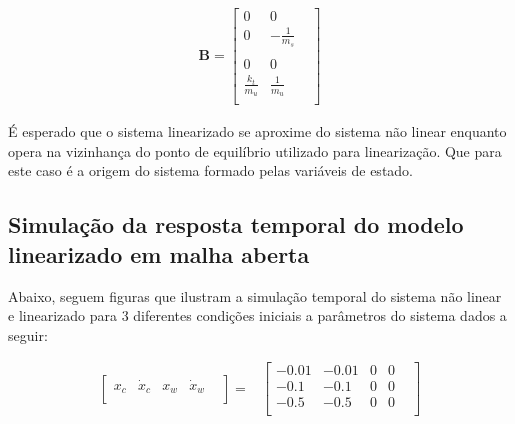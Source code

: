 \documentclass[a4paper]{ifacconf}
\begin{document}
    \begin{equation} 
    \begin{split}
        \mathbf{B} = 
        \begin{bmatrix}
            0 & 0 & \\
            0 & -\frac{1}{m_s}&\\ \\
            0 & 0 & \\
            \frac{k_t}{m_u}&\frac{1}{m_u} \\
        \end{bmatrix}
    \end{split}
    \end{equation}
    
    É esperado que o  sistema linearizado se aproxime do sistema não linear enquanto opera na vizinhança do ponto de equilíbrio utilizado para linearização. Que para este caso é a origem do sistema formado pelas variáveis de estado.
    
        \subsection{Simulação da resposta temporal do modelo linearizado em malha aberta}
    Abaixo, seguem figuras que ilustram a simulação temporal do sistema não linear e linearizado para 3 diferentes condições iniciais a parâmetros do sistema dados a seguir: 
    
    \begin{equation*} 
    \begin{split}
        \begin{bmatrix}
            x_c & \dot{x}_c & x_w & \dot{x}_w & \\
        \end{bmatrix}=
    \end{split}
    \begin{split}
        \begin{bmatrix}
            -0.01& -0.01& 0& 0& \\
             -0.1&  -0.1& 0& 0& \\
             -0.5&  -0.5& 0& 0&\\
        \end{bmatrix}
    \end{split}
    \end{equation*}
    
\end{document}
